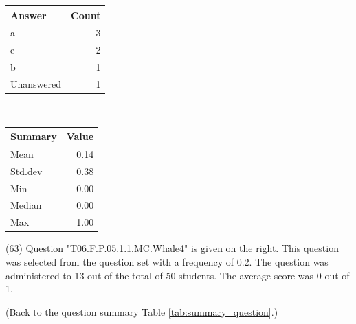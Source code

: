 \documentclass[12pt,english,nohyper]{tufte-handout}\usepackage[]{graphicx}\usepackage[]{color}
\begin{document}
\begin{center}%
\begin{tabular}{lr}
  \hline
Answer & Count \\ 
  \hline
a &   3 \\ 
  e &   2 \\ 
  b &   1 \\ 
  Unanswered &   1 \\ 
   \hline
\end{tabular}
~~~~~~~~%
\begin{tabular}{lr}
  \hline
Summary & Value \\ 
  \hline
Mean & 0.14 \\ 
  Std.dev & 0.38 \\ 
  Min & 0.00 \\ 
  Median & 0.00 \\ 
  Max & 1.00 \\ 
   \hline
\end{tabular}
\end{center}\newpage{} (63) Question "T06.F.P.05.1.1.MC.Whale4" is given on the right. This question was selected from the question set with a frequency of 0.2. The question was administered to 13 out of the total of 50 students. The average score was 0 out of 1.

 (Back to the question summary Table \ref{tab:summary_question}.)
\end{document}
